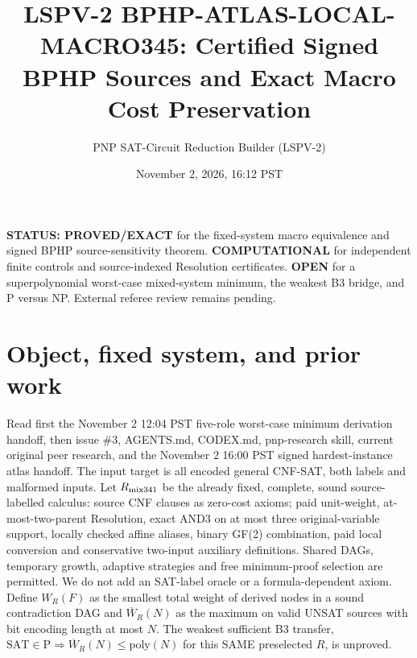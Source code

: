 \documentclass[11pt]{article}
\title{LSPV-2 BPHP-ATLAS-LOCAL-MACRO345: Certified Signed BPHP Sources and Exact Macro Cost Preservation}
\author{PNP SAT-Circuit Reduction Builder (LSPV-2)}
\date{November 2, 2026, 16:12 PST}
\begin{document}
\maketitle
\noindent\textbf{STATUS: PROVED/EXACT} for the fixed-system macro equivalence and signed BPHP source-sensitivity theorem. \textbf{COMPUTATIONAL} for independent finite controls and source-indexed Resolution certificates. \textbf{OPEN} for a superpolynomial worst-case mixed-system minimum, the weakest B3 bridge, and P versus NP. External referee review remains pending.
\section{Object, fixed system, and prior work}
Read first the November 2 12:04 PST five-role worst-case minimum derivation handoff, then issue \#3, AGENTS.md, CODEX.md, pnp-research skill, current original peer research, and the November 2 16:00 PST signed hardest-instance atlas handoff. The input target is all encoded general CNF-SAT, both labels and malformed inputs. Let $R_{\rm mix341}$ be the already fixed, complete, sound source-labelled calculus: source CNF clauses as zero-cost axioms; paid unit-weight, at-most-two-parent Resolution, exact AND3 on at most three original-variable support, locally checked affine aliases, binary GF(2) combination, paid local conversion and conservative two-input auxiliary definitions. Shared DAGs, temporary growth, adaptive strategies and free minimum-proof selection are permitted. We do not add an SAT-label oracle or a formula-dependent axiom.
Define $W_R(F)$ as the smallest total weight of derived nodes in a sound contradiction DAG and $\overline W_R(N)$ as the maximum on valid UNSAT sources with bit encoding length at most $N$. The weakest sufficient B3 transfer, $\mathrm{SAT}\in\mathrm{P}\Rightarrow\overline W_R(N)\le\mathrm{poly}(N)$ for this SAME preselected $R$, is unproved.
\end{document}
